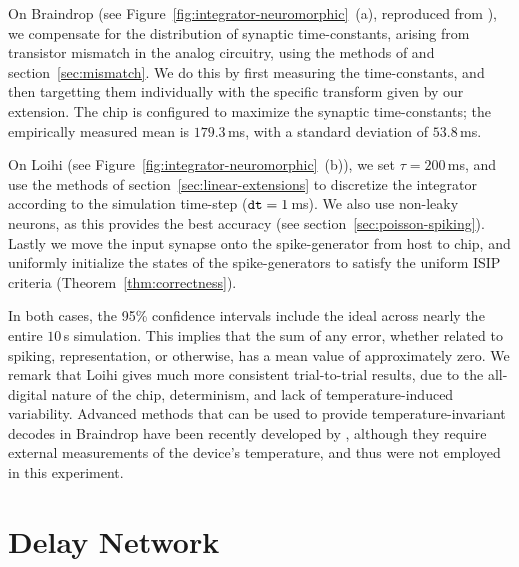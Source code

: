 On Braindrop (see Figure~\ref{fig:integrator-neuromorphic}~(a), reproduced from \citet[][Figure~15]{braindrop2019}), we compensate for the distribution of synaptic time-constants, arising from transistor mismatch in the analog circuitry, using the methods of \citet{voelker2017iscas} and section~\ref{sec:mismatch}.
We do this by first measuring the time-constants, and then targetting them individually with the specific transform given by our extension.
The chip is configured to maximize the synaptic time-constants; the empirically measured mean is $179.3$\,ms, with a standard deviation of $53.8$\,ms.

On Loihi (see Figure~\ref{fig:integrator-neuromorphic}~(b)), we set $\tau = 200$\,ms, and use the methods of section~\ref{sec:linear-extensions} to discretize the integrator according to the simulation time-step ($\texttt{dt}{} = 1$\,ms).
We also use non-leaky neurons, as this provides the best accuracy (see section~\ref{sec:poisson-spiking}).
Lastly we move the input synapse onto the spike-generator from host to chip, and uniformly initialize the states of the spike-generators to satisfy the uniform ISIP criteria (Theorem~\ref{thm:correctness}).

In both cases, the 95\% confidence intervals include the ideal across nearly the entire $10$\,s simulation.
This implies that the sum of any error, whether related to spiking, representation, or otherwise, has a mean value of approximately zero.
We remark that Loihi gives much more consistent trial-to-trial results, due to the all-digital nature of the chip, determinism, and lack of temperature-induced variability.
Advanced methods that can be used to provide temperature-invariant decodes in Braindrop have been recently developed by \citet{reidpint2019}, although they require external measurements of the device's temperature, and thus were not employed in this experiment.

\section{Delay Network}
\label{sec:neuromorphic-dn}

